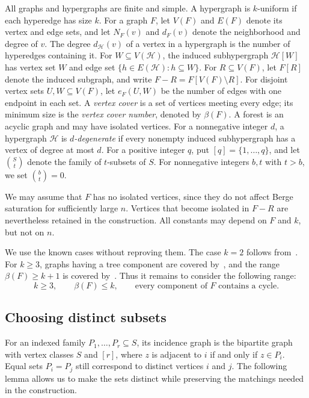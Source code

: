 \documentclass[10pt,a4paper]{article}
\numberwithin{equation}{section}
\theoremstyle{definition}
\theoremstyle{plain}
\newcommand{\HH}{\mathcal H}
\begin{document}
All graphs and hypergraphs are finite and simple. A hypergraph is
$k$-uniform if each hyperedge has size $k$.
For a graph $F$, let $V(F)$ and $E(F)$ denote its vertex and edge sets,
and let $N_F(v)$ and $d_F(v)$ denote the neighborhood and degree of $v$.
The degree $d_{\HH}(v)$ of a vertex in a hypergraph is the number of
hyperedges containing it. For $W\subseteq V(\HH)$, the induced
subhypergraph $\HH[W]$ has vertex set $W$ and edge set
$\{h\in E(\HH):h\subseteq W\}$. For $R\subseteq V(F)$, let $F[R]$ denote
the induced subgraph, and write $F-R=F[V(F)\setminus R]$.
For disjoint vertex sets $U,W\subseteq V(F)$, let $e_F(U,W)$ be the
number of edges with one endpoint in each set.
A \emph{vertex cover} is a set of vertices meeting every edge;
its minimum size is the \emph{vertex cover number}, denoted by $\beta(F)$.
A forest is an acyclic graph and may have isolated vertices.
For a nonnegative integer $d$, a hypergraph $\HH$ is
\emph{$d$-degenerate} if every nonempty induced subhypergraph has a
vertex of degree at most $d$. 
For a positive integer $q$, put $[q]=\{1,\ldots,q\}$, and let
$\binom St$ denote the family of $t$-subsets of $S$.
For nonnegative integers $b,t$ with $t>b$, we set $\binom bt=0$.

We may assume that $F$ has no isolated
vertices, since they do not affect Berge saturation for sufficiently
large $n$. Vertices that become isolated in $F-R$ are nevertheless
retained in the construction. All constants may depend on $F$ and $k$,
but not on $n$.

We use the known cases without reproving them. The case $k=2$ follows
from~\cite{KT}. For $k\ge3$, graphs having a tree component are covered
by~\cite[Observation~2.4]{EGMT}, and the range $\beta(F)\ge k+1$
is covered by~\cite[Theorem~2.5]{EGMT}. Thus it remains to consider
the following range:
\begin{equation}\label{eq:remaining}
 k\ge3,\qquad \beta(F)\le k,\qquad
 \text{every component of $F$ contains a cycle}.
\end{equation}

\subsection{Choosing distinct subsets}

For an indexed family $P_1,\ldots,P_r\subseteq S$, its incidence graph
is the bipartite graph with vertex classes $S$ and $[r]$, where $z$
is adjacent to $i$ if and only if $z\in P_i$. Equal sets $P_i=P_j$
still correspond to distinct vertices $i$ and $j$. The following
lemma allows us to make the sets distinct while preserving the
matchings needed in the construction.
\end{document}
